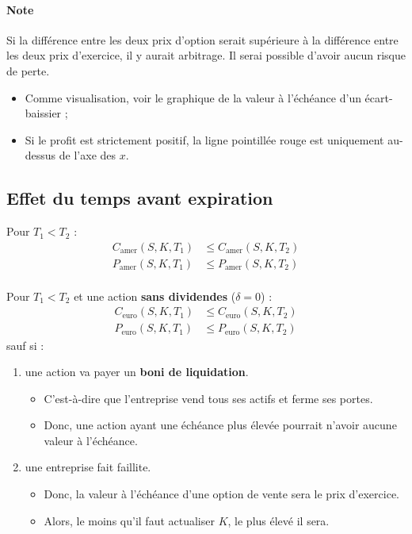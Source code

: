 \documentclass[10pt, french]{article}
\begin{document}
\begin{multicols*}{2}
\paragraph{Note}	Si la différence entre les deux prix d'option serait supérieure à la différence entre les deux prix d'exercice, il y aurait arbitrage. Il serai possible d'avoir aucun risque de perte.
\begin{itemize}
	\item	Comme visualisation, voir le graphique de la valeur à l'échéance d'un écart-baissier ;
	\item	Si le profit est strictement positif, la ligne pointillée rouge est uniquement au-dessus de l'axe des $x$.
\end{itemize}


\columnbreak
\subsection{Effet du temps avant expiration}
Pour $T_{1}	<	T_{2}$ :
\begin{align*}
	C_{\text{amer}}(S, K, T_{1})	&\leq	C_{\text{amer}}(S, K, T_{2})	\\
	P_{\text{amer}}(S, K, T_{1})	&\leq	P_{\text{amer}}(S, K, T_{2})	\\
\end{align*}

Pour $T_{1}	<	T_{2}$ et une action \textbf{sans dividendes} ($\delta	=	0$) : 
\begin{align*}
	C_{\text{euro}}(S, K, T_{1})	&\leq	C_{\text{euro}}(S, K, T_{2})	\\
	P_{\text{euro}}(S, K, T_{1})	&\leq	P_{\text{euro}}(S, K, T_{2})
\end{align*}
sauf si :
\begin{enumerate}
	\item	une action va payer un \textbf{boni de liquidation}.
		\begin{itemize}
		\item	C'est-à-dire que l'entreprise vend tous ses actifs et ferme ses portes.
		\item	Donc, une action ayant une échéance plus élevée pourrait n'avoir aucune valeur à l'échéance.
		\end{itemize}
	\item	une entreprise fait faillite.
		\begin{itemize}
		\item	Donc, la valeur à l'échéance d'une option de vente sera le prix d'exercice.
		\item	Alors, le moins qu'il faut actualiser $K$, le plus élevé il sera.
		\end{itemize}
\end{enumerate}



\end{multicols*}
\end{document}
